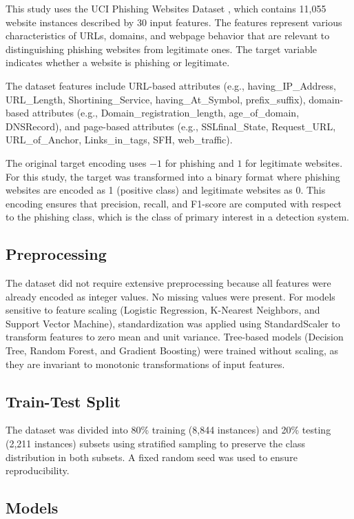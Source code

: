 \documentclass[conference]{IEEEtran}
\begin{document}
This study uses the UCI Phishing Websites Dataset \cite{uci2016}, which contains 11,055 website instances described by 30 input features. The features represent various characteristics of URLs, domains, and webpage behavior that are relevant to distinguishing phishing websites from legitimate ones. The target variable indicates whether a website is phishing or legitimate.

The dataset features include URL-based attributes (e.g., having\_IP\_Address, URL\_Length, Shortining\_Service, having\_At\_Symbol, prefix\_suffix), domain-based attributes (e.g., Domain\_registration\_length, age\_of\_domain, DNSRecord), and page-based attributes (e.g., SSLfinal\_State, Request\_URL, URL\_of\_Anchor, Links\_in\_tags, SFH, web\_traffic).

The original target encoding uses $-1$ for phishing and $1$ for legitimate websites. For this study, the target was transformed into a binary format where phishing websites are encoded as 1 (positive class) and legitimate websites as 0. This encoding ensures that precision, recall, and F1-score are computed with respect to the phishing class, which is the class of primary interest in a detection system.

\subsection{Preprocessing}

The dataset did not require extensive preprocessing because all features were already encoded as integer values. No missing values were present. For models sensitive to feature scaling (Logistic Regression, K-Nearest Neighbors, and Support Vector Machine), standardization was applied using StandardScaler to transform features to zero mean and unit variance. Tree-based models (Decision Tree, Random Forest, and Gradient Boosting) were trained without scaling, as they are invariant to monotonic transformations of input features.

\subsection{Train-Test Split}

The dataset was divided into 80\% training (8,844 instances) and 20\% testing (2,211 instances) subsets using stratified sampling to preserve the class distribution in both subsets. A fixed random seed was used to ensure reproducibility.

\subsection{Models}
\end{document}
